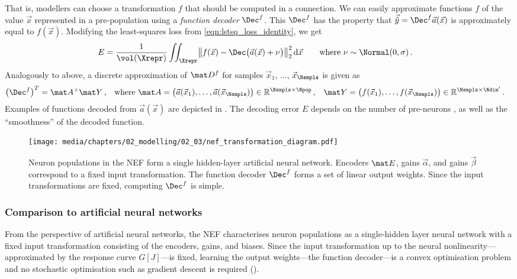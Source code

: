That is, modellers can choose a transformation $f$ that should be computed in a connection.
We can easily approximate functions $f$ of the value $\vec x$ represented in a pre-population using a \emph{function decoder} $\Dec^f$.
This $\Dec^f$ has the property that $\vec{\hat y} = \Dec^f \vec a(\vec x)$ is approximately equal to $f(\vec x)$.
Modifying the least-squares loss from \cref{eqn:lstsq_loss_identity}, we get
\begin{align}
	E &= \frac{1}{\vol(\Xrepr)} \iint_{\Xrepr} \bigl\| f(\vec x) - \Dec \bigl( \vec a(\vec x) + \nu \bigr) \bigr\|_2^2  \, \mathrm{d}\vec{x} \quad\quad \text{where } \nu \sim \Normal(0, \sigma) \,.
	\label{eqn:lstsq_loss_f}
\end{align}
Analogously to above, a discrete approximation of $\mat D^f$ for \Nsmpls samples ${\vec x}_1$, $\ldots$, ${\vec x}_{\Nsmpls}$ is given as 
\begin{align*}
	\bigl(\Dec^f\bigr)^T &= \mat A^+ \mat Y \,, &\text{where } \mat A &= \begin{pmatrix}\vec a(\vec x_1), \ldots, \vec a(\vec x_{\Nsmpls})\end{pmatrix} \in \mathbb{R}^{\Nsmpls \times \Npop} \,, & \mat Y &= \begin{pmatrix}f(\vec x_1), \ldots, f(\vec x_{\Nsmpls})\end{pmatrix} \in \mathbb{R}^{\Nsmpls \times \Ndim'} \,.
\end{align*}
Examples of functions decoded from $\vec a(\vec x)$ are depicted in .
The decoding error $E$ depends on the number of pre-neurons \Npop, as well as the \enquote{smoothness} of the decoded function.

\begin{figure}
	\centering
	\vspace{0.25mm}
	\texttt{[image: media/chapters/02\_modelling/02\_03/nef\_transformation\_diagram.pdf]}
	\caption[Neuron populations in the NEF as a single hidden-layer artificial neural network]{Neuron populations in the NEF form a single hidden-layer artificial neural network. Encoders $\mat E$, gains $\vec \alpha$, and gains $\vec \beta$ correspond to a fixed input transformation. The function decoder $\Dec^f$ forms a set of linear output weights. Since the input transformations are fixed, computing $\Dec^f$ is simple.}
	\label{fig:nef_transformation_diagram}
\end{figure}

\subsubsection{Comparison to artificial neural networks}
From the perspective of artificial neural networks, the NEF characterises neuron populations as a single-hidden layer neural network with a fixed input transformation consisting of the encoders, gains, and biases.
Since the input transformation up to the neural nonlinearity---approximated by the response curve $G[J]$---is fixed, learning the output weights---the function decoder---is a convex optimisation problem and no stochastic optimisation such as gradient descent is required ().

